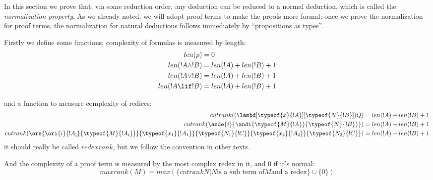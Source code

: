 \documentclass[../../../include/open-logic-section]{subfiles}
\begin{document}

In this section we prove that, via some reduction order, any
deduction can be reduced to a normal deduction, which is called the
\emph{normalization property}. As we already noted, we will adopt proof
terms to make the proofs more formal; once we prove the normalization
for proof terms, the normalization for natural deductions follows
immediately by ``propositions as types''.

Firstly we define some functions; complexity of formulas is measured by
length:
\begin{align*}
  len(p) &= 0\\
  len(!A \land !B) &= len(!A) + len(!B) + 1\\
  len(!A \lor !B) &= len(!A) + len(!B) + 1 \\
  len(!A \lif !B) &= len(!A) + len(!B) + 1
\end{align*}

and a function to  measure complexity of redices:
\begin{align*}
  cutrank((\lambd[\typeof{x}{!A}][\typeof{N}{!B}])Q) &= len(!A) + len(!B) + 1 \\
  cutrank(\ande{i}{\andi{\typeof{M}{!A}}{\typeof{N}{!B}}}) &= len(!A) + len(!B) + 1 \\
  cutrank(\ore{\ori{i}{!A_{\bar{i}}}{\typeof{M}{!A_i}}}{\typeof{x_1}{!A_1}}{\typeof{N_1}{!C}}{\typeof{x_2}{!A_2}}{\typeof{N_2}{!C}}) &=
  len(!A) + len(!B) + 1
\end{align*}
it should really be called $redexrank$, but we follow the convention
in other texts.

And the complexity of a proof term is measured by the most complex
redex in it, and $0$ if it's normal:
\begin{equation*}
  maxrank(M) = max(\{cutrank{N} | N \text{is a sub term of} M \text{and
    a redex}\} \cup \{0\})
\end{equation*}
\end{document}
